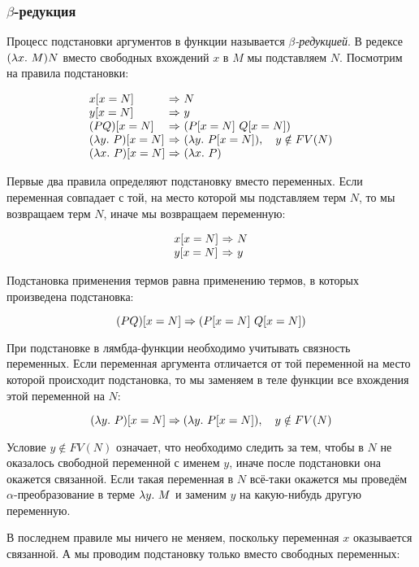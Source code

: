 \subsubsection{$\beta$-редукция}

Процесс подстановки аргументов в функции называется 
\emph{$\beta$-редукцией}. В редексе $(\lambda x .\  M) N$
вместо свободных вхождений $x$ в $M$ мы подставляем $N$.
Посмотрим на правила подстановки:

\[\begin{array}{l@{\ \RA\ }l}
x[x=N] & N \\
y[x=N] & y \\
(PQ)[x=N]   & (P[x=N]\ Q[x=N]) \\
(\lambda y \D P)[x = N] & (\lambda y \D P[x=N]), \quad y \notin FV(N)    \\ 
(\lambda x \D P)[x = N] & (\lambda x \D P)   \\
\end{array}\]

Первые два правила определяют подстановку вместо переменных.
Если переменная совпадает с той, на место которой мы подставляем
терм $N$, то мы возвращаем терм $N$, иначе мы возвращаем переменную:

\[\begin{array}{l@{\ \RA\ }l}
x[x=N] & N \\
y[x=N] & y \\
\end{array}\]

Подстановка применения термов равна применению термов, в которых
произведена подстановка:

\[ (PQ)[x=N]  \RA (P[x=N]\ Q[x=N]) \]

При подстановке в лямбда-функции необходимо учитывать связность
переменных. Если переменная аргумента отличается от той
переменной на место которой происходит подстановка, то 
мы заменяем в теле функции все вхождения этой переменной на $N$:

\[ (\lambda y .\  P)[x = N] \Rightarrow (\lambda y .\  P[x=N]), \quad y \notin FV(N) \]

Условие $y \notin FV(N)$ означает, что необходимо следить за
тем, чтобы в $N$ не оказалось свободной переменной с именем $y$, иначе
после подстановки она окажется связанной. Если такая переменная в $N$
всё-таки окажется мы проведём $\alpha$-преобразование в терме
$\lambda y .\  M$ и заменим $y$ на какую-нибудь другую переменную.

В последнем правиле мы ничего не меняем, поскольку переменная
$x$ оказывается связанной. А мы проводим подстановку только
вместо свободных переменных:

